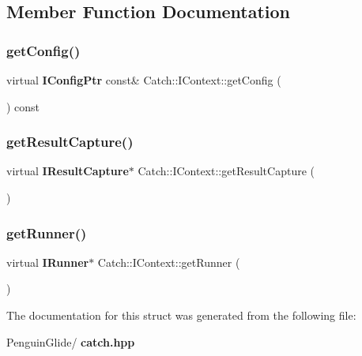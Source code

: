 \subsection{Member Function Documentation}
\mbox{\label{struct_catch_1_1_i_context_a72a2718232adea8925fec9e71d3efd75}} 
\subsubsection{getConfig()}
{\footnotesize\ttfamily virtual \textbf{ I\+Config\+Ptr} const\& Catch\+::\+I\+Context\+::get\+Config (\begin{DoxyParamCaption}{ }\end{DoxyParamCaption}) const\hspace{0.3cm}{\ttfamily [pure virtual]}}

\mbox{\label{struct_catch_1_1_i_context_a684e4ae71d1fdf3060c352ecde1d122f}} 
\subsubsection{getResultCapture()}
{\footnotesize\ttfamily virtual \textbf{ I\+Result\+Capture}$\ast$ Catch\+::\+I\+Context\+::get\+Result\+Capture (\begin{DoxyParamCaption}{ }\end{DoxyParamCaption})\hspace{0.3cm}{\ttfamily [pure virtual]}}

\mbox{\label{struct_catch_1_1_i_context_af088415dde18d039ed5a2f95b02767c6}} 
\subsubsection{getRunner()}
{\footnotesize\ttfamily virtual \textbf{ I\+Runner}$\ast$ Catch\+::\+I\+Context\+::get\+Runner (\begin{DoxyParamCaption}{ }\end{DoxyParamCaption})\hspace{0.3cm}{\ttfamily [pure virtual]}}



The documentation for this struct was generated from the following file\+:\begin{DoxyCompactItemize}
\item 
Penguin\+Glide/\textbf{ catch.\+hpp}\end{DoxyCompactItemize}
